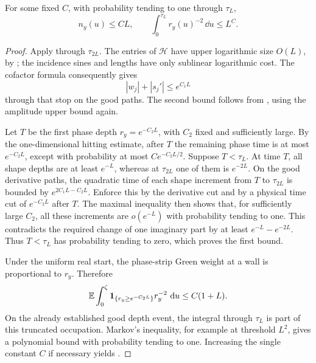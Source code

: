 \begin{lemma}
\label{odd:phase-clock}
For some fixed \(C\), with probability tending to one through \(\tau_L\),
\begin{equation}
 n_y(u)\le CL,\qquad
 \int_0^{\tau_L}r_y(u)^{-2}\,\dd u\le L^C.
 \label{odd:phase-clock-bounds}
\end{equation}
\end{lemma}

\begin{proof}
Apply  through \(\tau_{2L}\).  The entries of
\(\mathcal H\) have upper logarithmic size \(O(L)\), by
; the incidence sines and lengths have only
sublinear logarithmic cost.  The cofactor formula
 consequently gives
\begin{equation}
 |w_j|+|s_j'|\le e^{C_1L}
 \label{odd:rough-derivative-bound}
\end{equation}
through that stop on the good paths.  The second bound follows from
, using the amplitude upper bound again.

Let \(T\) be the first phase depth \(r_y=e^{-C_2L}\), with \(C_2\) fixed
and sufficiently large.  By the one-dimensional hitting estimate, after
\(T\) the remaining phase time is at most \(e^{-C_2L}\), except with
probability at most \(C e^{-C_2L/2}\).  Suppose \(T<\tau_L\).  At time
\(T\), all shape depths are at least \(e^{-L}\), whereas at
\(\tau_{2L}\) one of them is \(e^{-2L}\).  On the good derivative paths,
the quadratic time of each shape increment from \(T\) to
\(\tau_{2L}\) is bounded by
\(e^{2C_1L-C_2L}\).  Enforce this by the derivative cut and by a physical
time cut of \(e^{-C_2L}\) after \(T\).  The maximal inequality then shows
that, for sufficiently large \(C_2\), all these increments are
\(o(e^{-L})\) with probability tending to one.  This contradicts the
required change of one imaginary part by at least
\(e^{-L}-e^{-2L}\).  Thus \(T<\tau_L\) has probability tending to zero,
which proves the first bound.

Under the uniform real start, the phase-strip Green weight at a wall is
proportional to \(r_y\).  Therefore
\[
 \mathbb E\int_0^\zeta
    \mathbf 1_{\{r_y\ge e^{-C_2L}\}}r_y^{-2}\,\,\mathrm d u
       \le C(1+L).
\]
On the already established good depth event, the integral through
\(\tau_L\) is part of this truncated occupation.  Markov's inequality,
for example at threshold \(L^2\), gives a polynomial bound with
probability tending to one.  Increasing the single constant \(C\) if
necessary yields .
\end{proof}


